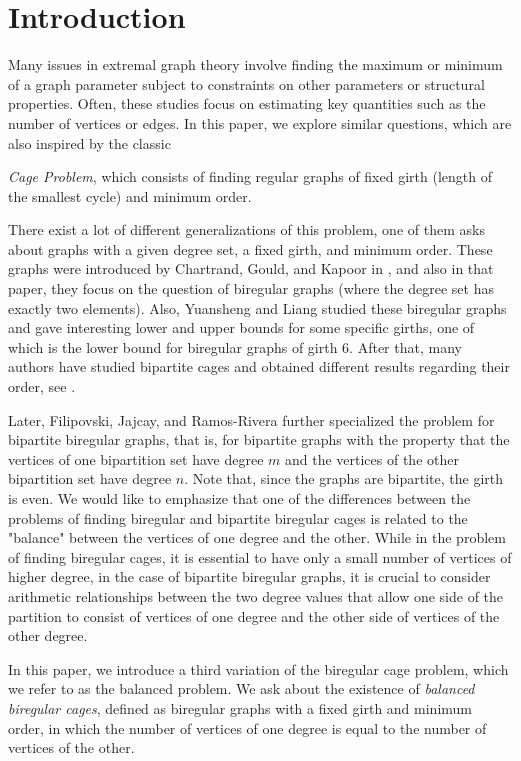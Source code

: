 \documentclass[a4paper,11pt]{article}
\begin{document}
\section{Introduction}
Many issues in extremal graph theory involve finding the maximum or minimum of a graph parameter subject to constraints on other parameters or structural properties. Often, these studies focus on estimating key quantities such as the number of vertices or edges. In this paper, we explore similar questions, which are also inspired by the classic {{\em{Cage Problem}}, which consists of finding regular graphs of fixed girth (length of the smallest cycle) and minimum order. 


There exist a lot of different generalizations of this problem, one of them asks about graphs with a given degree set, a fixed girth, and minimum order. These graphs were introduced by Chartrand, Gould, and Kapoor in \cite{CGK81}, and also in that paper, they focus on the question of biregular graphs (where the degree set has exactly two elements). Also, Yuansheng and Liang \cite{YuLi03} studied these biregular graphs and gave interesting lower and upper bounds for some specific girths, one of which is the lower bound for biregular graphs of girth $6$. After that, many authors have studied bipartite cages and obtained different results regarding their order, see \cite{AraExoJaj, BobJajPis, ExooJaj16, Fil17, JWGJS}.

Later, Filipovski, Jajcay, and Ramos-Rivera \cite{FilRamRivJaj19} further specialized the problem for bipartite biregular graphs, that is, for bipartite graphs with the property that the vertices of one bipartition set have degree $m$ and the vertices of the other bipartition set have degree $n$. Note that, since the graphs are bipartite, the girth is even. We would like to emphasize that one of the differences between the problems of finding biregular and bipartite biregular cages is related to the "balance" between the vertices of one degree and the other. While in the problem of finding biregular cages, it is essential to have only a small number of vertices of higher degree, in the case of bipartite biregular graphs, it is crucial to consider arithmetic relationships between the two degree values that allow one side of the partition to consist of vertices of one degree and the other side of vertices of the other degree.

In this paper, we introduce a third variation of the biregular cage problem, which we refer to as the balanced problem. We ask about the existence of {\emph{balanced biregular cages}}, defined as biregular graphs with a fixed girth and minimum order, in which the number of vertices of one degree is equal to the number of vertices of the other. 

}
\end{document}
